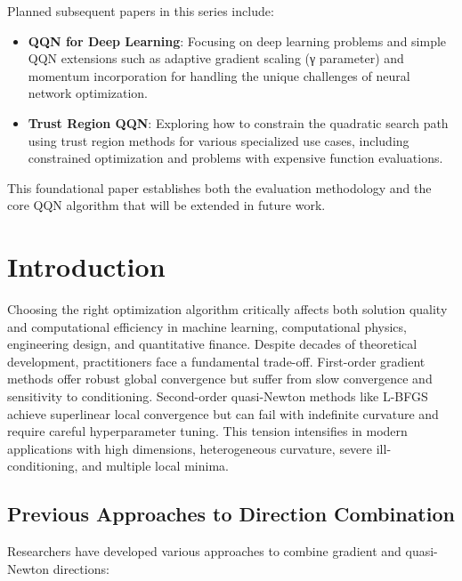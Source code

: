 Planned subsequent papers in this series include:

\begin{itemize}
\tightlist
\item
  \textbf{QQN for Deep Learning}: Focusing on deep learning problems and simple QQN extensions such as adaptive gradient scaling (γ parameter) and momentum incorporation for handling the unique challenges of neural network optimization.
\item
  \textbf{Trust Region QQN}: Exploring how to constrain the quadratic search path using trust region methods for various specialized use cases, including constrained optimization and problems with expensive function evaluations.
\end{itemize}

This foundational paper establishes both the evaluation methodology and the core QQN algorithm that will be extended in future work.

\hypertarget{introduction}{%
\section{Introduction}\label{introduction}}

Choosing the right optimization algorithm critically affects both solution quality and computational efficiency in machine learning, computational physics, engineering design, and quantitative finance.
Despite decades of theoretical development, practitioners face a fundamental trade-off.
First-order gradient methods offer robust global convergence but suffer from slow convergence and sensitivity to conditioning.
Second-order quasi-Newton methods like L-BFGS achieve superlinear local convergence but can fail with indefinite curvature and require careful hyperparameter tuning.
This tension intensifies in modern applications with high dimensions, heterogeneous curvature, severe ill-conditioning, and multiple local minima.

\hypertarget{previous-approaches-to-direction-combination}{%
\subsection{Previous Approaches to Direction Combination}\label{previous-approaches-to-direction-combination}}

Researchers have developed various approaches to combine gradient and quasi-Newton directions:

